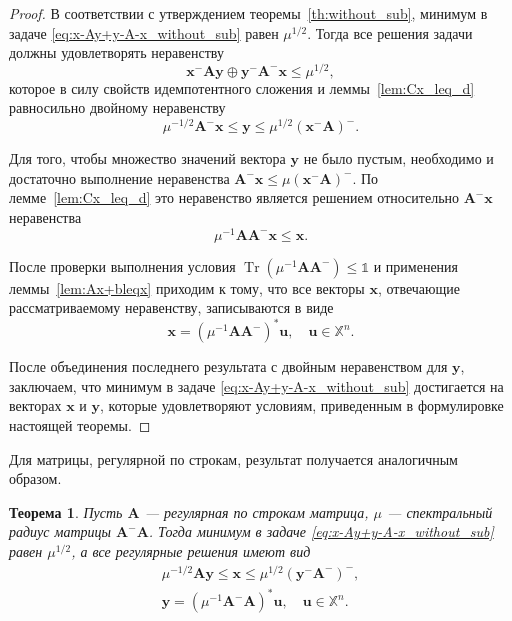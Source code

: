 \documentclass[specialist,
               substylefile = spbu.rtx,
               subf,href,colorlinks=true, 12pt]{disser}
\newtheorem{theorem}{Теорема}
\DeclareMathOperator{\Tr}{Tr}
\theoremstyle{definition}
\begin{document}
\begin{proof}
В соответствии с утверждением теоремы~\ref{th:without_sub}, минимум в задаче \eqref{eq:x-Ay+y-A-x_without_sub} равен $\mu^{1/2}$. Тогда все решения задачи должны удовлетворять неравенству
\begin{equation*}
\bm{x}^{-}\bm{A}\bm{y}\oplus\bm{y}^{-}\bm{A}^{-}\bm{x}\leq\mu^{1/2},
\end{equation*}
которое в силу свойств идемпотентного сложения и леммы~\ref{lem:Cx_leq_d} равносильно двойному неравенству
\begin{equation*}
\mu^{-1/2}\bm{A}^{-}\bm{x}\leq
\bm{y}\leq\mu^{1/2}(\bm{x}^{-}\bm{A})^{-}.
\end{equation*}

Для того, чтобы множество значений вектора $\bm{y}$ не было пустым, необходимо и достаточно выполнение неравенства $\bm{A}^{-}\bm{x}\leq\mu(\bm{x}^{-}\bm{A})^{-}$. По лемме~\ref{lem:Cx_leq_d} это неравенство является решением относительно $\bm{A}^{-}\bm{x}$ неравенства
\begin{equation*}
\mu^{-1}\bm{A}\bm{A}^{-}\bm{x}
\leq
\bm{x}.
\end{equation*}

После проверки выполнения условия $\Tr(\mu^{-1}\bm{A}\bm{A}^{-})\leq\mathbb{1}$ и применения леммы~\ref{lem:Ax+bleqx} приходим к тому, что все векторы $\bm{x}$, отвечающие рассматриваемому неравенству, записываются в виде
\begin{equation*}
\bm{x}=(\mu^{-1}\bm{A}\bm{A}^{-})^{\ast}\bm{u},
\quad
\bm{u}\in\mathbb{X}^{n}.
\end{equation*}

После объединения последнего результата с двойным неравенством для $\bm{y}$, заключаем, что минимум в задаче \eqref{eq:x-Ay+y-A-x_without_sub} достигается на векторах $\bm{x}$ и $\bm{y}$, которые удовлетворяют условиям, приведенным в формулировке настоящей теоремы.
\end{proof}

Для матрицы, регулярной по строкам, результат получается аналогичным образом. %
\begin{theorem}
\label{th:without_sub_row-regular}
Пусть $\bm{A}$ --- регулярная по строкам матрица, $\mu$ --- спектральный радиус матрицы $\bm{A}^{-}\bm{A}$. 
Тогда минимум в задаче \eqref{eq:x-Ay+y-A-x_without_sub} равен $\mu^{1/2}$, а все регулярные решения имеют вид
\begin{gather*}
\mu^{-1/2}\bm{A}\bm{y}
\leq
\bm{x}
\leq
\mu^{1/2}(\bm{y}^{-}\bm{A}^{-})^{-},\\
\bm{y}=(\mu^{-1}\bm{A}^{-}\bm{A})^{\ast}\bm{u},
\quad
\bm{u}\in\mathbb{X}^{n}.
\end{gather*}
\end{theorem}
\end{document}

